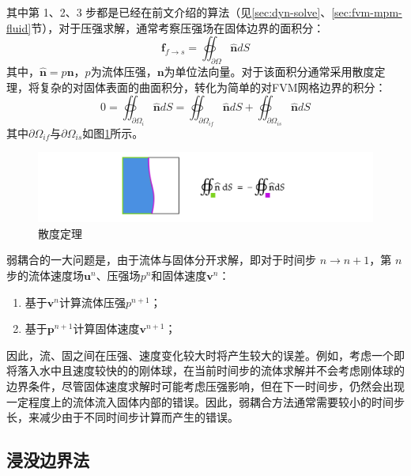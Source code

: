其中第 1、2、3 步都是已经在前文介绍的算法（见\ref{sec:dyn-solve}、\ref{sec:fvm-mpm-fluid}节），对于压强求解，通常考察压强场在固体边界的面积分：
\begin{equation}
  \label{eq:pressure-field-integration}
  \mathbf f_{f\rightarrow s} = \oiint_{\partial \Omega} \hat{\mathbf n} dS
\end{equation}
其中，$\hat{\mathbf n} = p \mathbf n$，$p$为流体压强，$\mathbf n$为单位法向量。对于该面积分通常采用散度定理，将复杂的对固体表面的曲面积分，转化为简单的对FVM网格边界的积分：
\begin{equation}
  0 = \oiint_{\partial \Omega_i} \hat{\mathbf n} dS = \oiint_{\partial \Omega_{if}} \hat{\mathbf n} dS + \oiint_{\partial \Omega_{is}} \hat{\mathbf n} dS
\end{equation}
其中$\partial \Omega_{if}$与$\partial \Omega_{is}$如图\ref{fig:fluid-divergence-theo}所示。

\begin{figure}[hbt]
  \centering
  \includegraphics[width=0.9\linewidth]{img/diagram-20230501.png}
  \caption{散度定理}\label{fig:fluid-divergence-theo}
\end{figure}

弱耦合的一大问题是，由于流体与固体分开求解，即对于时间步 $n\rightarrow n+1$，第 $n$ 步的流体速度场$\mathbf u^n$、压强场$p^n$和固体速度$\mathbf v^{n}$：
\begin{enumerate}
  \item 基于$\mathbf v^n$计算流体压强$p^{n+1}$；
  \item 基于$\mathbf p^{n+1}$计算固体速度$\mathbf v^{n+1}$；
\end{enumerate}

因此，流、固之间在压强、速度变化较大时将产生较大的误差。例如，考虑一个即将落入水中且速度较快的的刚体球，在当前时间步的流体求解并不会考虑刚体球的边界条件，尽管固体速度求解时可能考虑压强影响，但在下一时间步，仍然会出现一定程度上的流体流入固体内部的错误。因此，弱耦合方法通常需要较小的时间步长，来减少由于不同时间步计算而产生的错误。

\subsection{浸没边界法}

